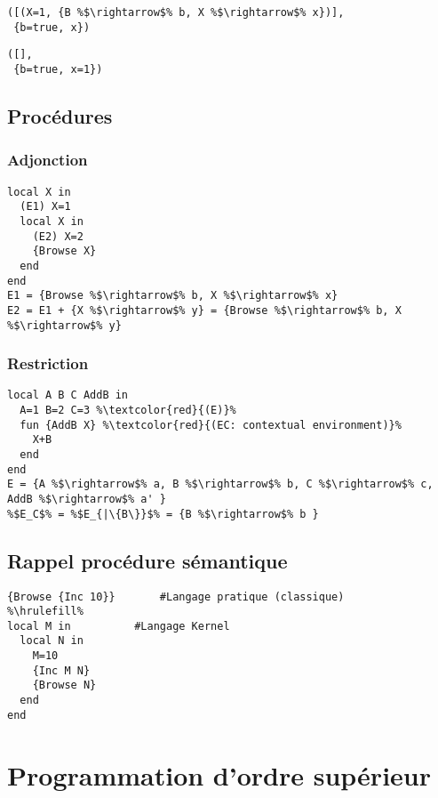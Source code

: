 \documentclass{report}
\begin{document}
\begin{minipage}[t]{0.45\linewidth}
\begin{lstlisting}[escapechar=\%]
([(X=1, {B %$\rightarrow$% b, X %$\rightarrow$% x})],
 {b=true, x})
\end{lstlisting}
\end{minipage}
%
\begin{minipage}[t]{0.45\linewidth}
\begin{lstlisting}[escapechar=\%]
([],
 {b=true, x=1})
\end{lstlisting}
\end{minipage}

\subsection{Procédures}
\subsubsection{Adjonction}
\begin{lstlisting}[escapechar=\%]
local X in
  (E1) X=1 
  local X in 
    (E2) X=2 
    {Browse X}
  end 
end
E1 = {Browse %$\rightarrow$% b, X %$\rightarrow$% x}
E2 = E1 + {X %$\rightarrow$% y} = {Browse %$\rightarrow$% b, X %$\rightarrow$% y}
\end{lstlisting}

\subsubsection{Restriction}
\begin{lstlisting}[escapechar=\%]
local A B C AddB in
  A=1 B=2 C=3 %\textcolor{red}{(E)}%
  fun {AddB X} %\textcolor{red}{(EC: contextual environment)}%
    X+B
  end
end
E = {A %$\rightarrow$% a, B %$\rightarrow$% b, C %$\rightarrow$% c, AddB %$\rightarrow$% a' }
%$E_C$% = %$E_{|\{B\}}$% = {B %$\rightarrow$% b }
\end{lstlisting}

\subsection{Rappel procédure sémantique}
\begin{lstlisting}[escapechar=\%]
{Browse {Inc 10}}		#Langage pratique (classique)
%\hrulefill%
local M in		 	#Langage Kernel
  local N in
    M=10
    {Inc M N}
    {Browse N}
  end
end
\end{lstlisting}

\section{Programmation d'ordre supérieur}
\end{document}
